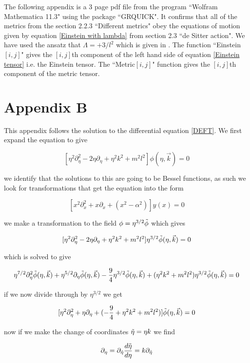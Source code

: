 \documentclass[a4paper,11pt]{article}
\numberwithin{equation}{section}
\numberwithin{figure}{section}
\begin{document}
\begin{large}
The following appendix is a 3 page pdf file from the program ``Wolfram Mathematica 11.3" using the package ``GRQUICK". It confirms that all of the metrics from the section 2.2.3 ``Different metrics" obey the equations of motion given by equation \eqref{Einstein with lambda} from section 2.3 ``de Sitter action". We have used the ansatz that $\Lambda=+3/l^2$ which is given in \cite{de Sitter musings}. The function ``Einstein$[i,j]$" gives the $[i,j]$th component of the left hand side of equation \eqref{Einstein tensor} i.e. the Einstein tensor. The ``Metric$[i,j]$" function gives the $[i,j]$th component of the metric tensor.



\newpage

\section*{Appendix B}

This appendix follows the solution to the differential equation \eqref{DEFT}. We first expand the equation to give

$$[\eta^2\partial_\eta^2-2\eta\partial_\eta+\eta^2k^2+m^2l^2]\phi(\eta,\Vec{k})=0$$

we identify that the solutions to this are going to be Bessel functions, as such we look for transformations that get the equation into the form

$$[x^2\partial_x^2+x\partial_x+(x^2-\alpha^2)]y(x)=0$$

we make a transformation to the field $\phi=\eta^{3/2}\Tilde{\phi}$ which gives 

$$[\eta^2\partial_\eta^2-2\eta\partial_\eta+\eta^2k^2+m^2l^2]\eta^{3/2}\Tilde{\phi}(\eta,\Vec{k})=0$$

which is solved to give

$$\eta^{7/2}\partial_\eta^2\Tilde{\phi}(\eta,\Vec{k})+\eta^{5/2}\partial_\eta\Tilde{\phi}(\eta,\Vec{k})-\frac{9}{4}\eta^{3/2}\Tilde{\phi}(\eta,\Vec{k})+(\eta^2k^2+m^2l^2)\eta^{3/2}\Tilde{\phi}(\eta,\Vec{k})=0$$

if we now divide through by $\eta^{3/2}$ we get

$$[\eta^2\partial_\eta^2+\eta\partial_\eta+(-\frac{9}{4}+\eta^2k^2+m^2l^2)]\Tilde{\phi}(\eta,\Vec{k})=0$$

now if we make the change of coordinates $\Tilde{\eta}=\eta k$ we find 

$$\partial_\eta=\partial_{\Tilde{\eta}}\frac{d\Tilde{\eta}}{d\eta}=k\partial_{\Tilde{\eta}}$$


\end{large}
\end{document}
